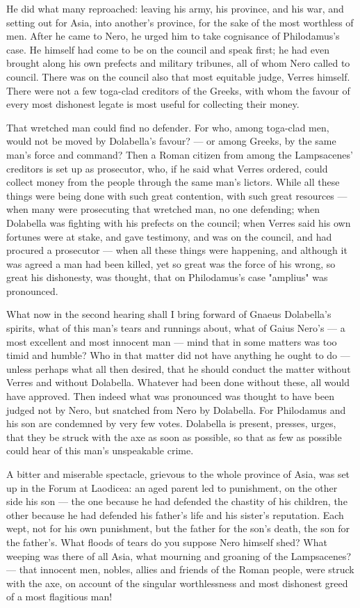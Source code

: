 He did what many reproached: leaving his army, his province, and his war, and setting out for Asia, into another's province, for the sake of the most worthless of men. After he came to Nero, he urged him to take cognisance of Philodamus's case. He himself had come to be on the council and speak first; he had even brought along his own prefects and military tribunes, all of whom Nero called to council. There was on the council also that most equitable judge, Verres himself. There were not a few toga-clad creditors of the Greeks, with whom the favour of every most dishonest legate is most useful for collecting their money.

 That wretched man could find no defender. For who, among toga-clad men, would not be moved by Dolabella's favour? --- or among Greeks, by the same man's force and command? Then a Roman citizen from among the Lampsacenes' creditors is set up as prosecutor, who, if he said what Verres ordered, could collect money from the people through the same man's lictors. While all these things were being done with such great contention, with such great resources --- when many were prosecuting that wretched man, no one defending; when Dolabella was fighting with his prefects on the council; when Verres said his own fortunes were at stake, and gave testimony, and was on the council, and had procured a prosecutor --- when all these things were happening, and although it was agreed a man had been killed, yet so great was the force of his wrong, so great his dishonesty, was thought, that on Philodamus's case "amplius" was pronounced.

 What now in the second hearing shall I bring forward of Gnaeus Dolabella's spirits, what of this man's tears and runnings about, what of Gaius Nero's --- a most excellent and most innocent man --- mind that in some matters was too timid and humble? Who in that matter did not have anything he ought to do --- unless perhaps what all then desired, that he should conduct the matter without Verres and without Dolabella. Whatever had been done without these, all would have approved. Then indeed what was pronounced was thought to have been judged not by Nero, but snatched from Nero by Dolabella. For Philodamus and his son are condemned by very few votes. Dolabella is present, presses, urges, that they be struck with the axe as soon as possible, so that as few as possible could hear of this man's unspeakable crime.

 A bitter and miserable spectacle, grievous to the whole province of Asia, was set up in the Forum at Laodicea: an aged parent led to punishment, on the other side his son --- the one because he had defended the chastity of his children, the other because he had defended his father's life and his sister's reputation. Each wept, not for his own punishment, but the father for the son's death, the son for the father's. What floods of tears do you suppose Nero himself shed? What weeping was there of all Asia, what mourning and groaning of the Lampsacenes? --- that innocent men, nobles, allies and friends of the Roman people, were struck with the axe, on account of the singular worthlessness and most dishonest greed of a most flagitious man!

